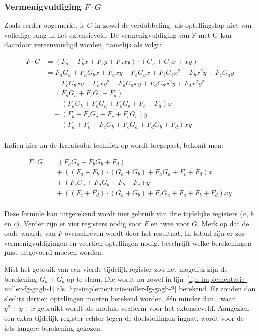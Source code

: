 \subsubsection{Vermenigvuldiging $F \cdot G$}

Zoals eerder opgemerkt, is $G$ in zowel de verdubbeling- als optellingstap niet van volledige rang in het extensieveld. De vermenigvuldiging van F met G kan daardoor vereenvoudigd worden, namelijk als volgt:

\[\begin{aligned}
F \cdot G	&= (F_a + F_b x + F_c y + F_d xy) \cdot (G_a + G_b x + xy)\\
	&= F_a G_a + F_a G_b x + F_a xy + F_b G_a x + F_b G_b x^2 + F_b x^2y + F_c G_a y\\
		&\quad + F_c G_b xy + F_c xy^2 + F_d G_a xy + F_d G_b x^2y + F_d x^2 y^2\\
	&= (F_a G_a + F_b G_b + F_d)\\
		&\quad + (F_a G_b + F_b G_a + F_b G_b + F_c + F_d)x\\
		&\quad + (F_b + F_c G_a + F_c + F_d G_b)y\\
		&\quad + (F_a + F_b + F_c G_b + F_d G_a + F_d G_b + F_d)xy\\
\end{aligned}\]

Indien hier nu de Karatsuba techniek op wordt toegepast, bekomt men:

\[\begin{aligned}
F \cdot G &= (F_a G_a + F_b G_b + F_d)\\
				&\quad + ((F_a + F_b) \cdot (G_a + G_b) + F_a G_a + F_c + F_d)x\\
				&\quad + (F_c G_a + F_d G_b + F_b + F_c)y\\
				&\quad + ((F_c + F_d) \cdot (G_a + G_b) + F_c G_a + F_a + F_b + F_d)xy\\
\end{aligned}\]

Deze formule kan uitgerekend wordt met gebruik van drie tijdelijke registers ($a$, $b$ en $c$). Verder zijn er vier registers nodig voor $F$ en twee voor $G$. Merk op dat de oude waarde van $F$ overschreven wordt door het resultaat. In totaal zijn er zes vermenigvuldigingen en veertien optellingen nodig.  beschrijft welke berekeningen juist uitgevoerd moeten worden.

Mist het gebruik van een vierde tijdelijk register zou het mogelijk zijn de berekening $G_a + G_b$ op te slaan. Die wordt nu zowel in lijn~\ref{lijn-implementatie-miller-fg-gagb-1} als \ref{lijn-implementatie-miller-fg-gagb-2} berekend. Er zouden dan slechts dertien optellingen moeten berekend worden, \'e\'en minder dan \cite{beuchat}, waar $y^2 + y +x$ gebruikt wordt als modulo veelterm voor het extensieveld. Aangezien een extra tijdelijk register echter tegen de doelstellingen ingaat, wordt voor de iets langere berekening gekozen.

